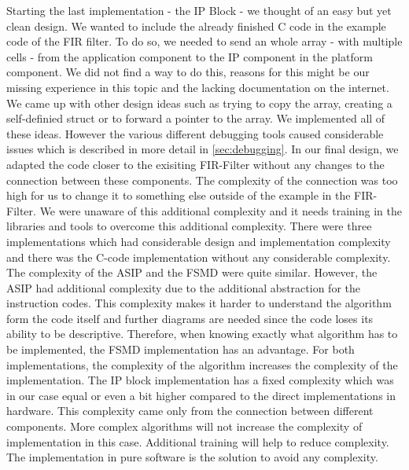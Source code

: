 \documentclass[conference]{IEEEtran}
\begin{document}
Starting the last implementation - the IP Block - we thought of an easy but yet clean design. We wanted to include the already finished C code in the example code of the FIR filter. To do so, we needed to send an whole array - with multiple cells - from the application component to the IP component in the platform component. We did not find a way to do this, reasons for this might be our missing experience in this topic and the lacking documentation on the internet. We came up with other design ideas such as trying to copy the array, creating a self-definied struct or to forward a pointer to the array. We implemented all of these ideas. However the various different debugging tools caused considerable issues which is described in more detail in \ref*{sec:debugging}. In our final design, we adapted the code closer to the exisiting FIR-Filter without any changes to the connection between these components. The complexity of the connection was too high for us to change it to something else outside of the example in the FIR-Filter. We were unaware of this additional complexity and it needs training in the libraries and tools to overcome this additional complexity.
There were three implementations which had considerable design and implementation complexity and there was the C-code implementation without any considerable complexity. The complexity of the ASIP and the FSMD were quite similar. However, the ASIP had additional complexity due to the additional abstraction for the instruction codes. This complexity makes it harder to understand the algorithm form the code itself and further diagrams are needed since the code loses its ability to be descriptive. Therefore, when knowing exactly what algorithm has to be implemented, the FSMD implementation has an advantage. For both implementations, the complexity of the algorithm increases the complexity of the implementation. The IP block implementation has a fixed complexity which was in our case equal or even a bit higher compared to the direct implementations in hardware. This complexity came only from the connection between different components. More complex algorithms  will not increase the complexity of implementation in this case. Additional training will help to reduce complexity.\\
The implementation in pure software is the solution to avoid any complexity.\\
\end{document}
